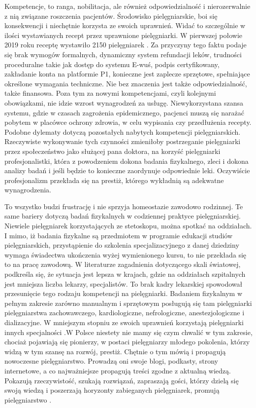 \documentclass[a4paper,12pt,twoside,openany]{report}
\begin{document}
Kompetencje, to ranga, nobilitacja, ale również odpowiedzialność i nierozerwalnie z nią związane roszczenia pacjentów. Środowisko pielęgniarskie, boi się konsekwencji i niechętnie korzysta ze swoich uprawnień. Widać to szczególnie w ilości wystawianych recept przez uprawnione pielęgniarki. W pierwszej połowie 2019 roku receptę wystawiło 2150 pielęgniarek \cite{model}. Za przyczyny tego faktu podaje się brak wymogów formalnych, dynamiczny system refundacji leków, trudności proceduralne takie jak dostęp do systemu E-wuś, podpis certyfikowany, zakładanie konta na platformie P1, konieczne jest zaplecze sprzętowe, spełniające określone wymagania techniczne.  Nie bez znaczenia jest także odpowiedzialność, także finansowa. Poza tym za nowymi kompetencjami, czyli kolejnymi obowiązkami, nie idzie wzrost wynagrodzeń za usługę. Niewykorzystana szansa systemu, gdzie w czasach zagrożenia epidemicznego, pacjenci muszą się narażać pobytem w placówce ochrony zdrowia, w celu wypisania czy przedłużenia recepty. Podobne dylematy dotyczą pozostałych nabytych kompetencji pielęgniarskich. Rzeczywiste wykonywanie tych czynności zmieniłoby postrzeganie pielęgniarki przez społeczeństwo jako służącej pana doktora, na korzyść pielęgniarki profesjonalistki, która z powodzeniem dokona badania fizykalnego, zleci i dokona analizy badań i jeśli będzie to konieczne zaordynuje odpowiednie leki. Oczywiście profesjonalizm przekłada się na prestiż, którego wykładnią są adekwatne wynagrodzenia. 

To wszystko budzi frustrację i nie sprzyja homeostazie zawodowo rodzinnej.  Te same bariery dotyczą badań fizykalnych w codziennej praktyce pielęgniarskiej. Niewiele  pielęgniarek  korzystających ze stetoskopu,  można spotkać na oddziałach. I mimo, iż badania fizykalne są przedmiotem w programie edukacji studiów pielęgniarskich, przystąpienie do szkolenia specjalizacyjnego z danej dziedziny wymaga świadectwa ukończenia wyżej wymienionego kursu, to nie przekłada się to na pracę zawodową. W literaturze zagadnienia dotyczącego skali światowej, podkreśla się, że sytuacja jest lepsza w krajach, gdzie na oddziałach szpitalnych jest mniejsza liczba lekarzy, specjalistów. To brak kadry lekarskiej spowodował przesunięcie tego rodzaju kompetencji na pielęgniarki. Badaniem fizykalnym w pełnym zakresie zarówno manualnym i sprzętowym posługują się tam pielęgniarki pielęgniarstwa zachowawczego, kardiologiczne, nefrologiczne, anestezjologiczne i dializacyjne. W mniejszym stopniu ze swoich uprawnień korzystają pielęgniarki innych specjalności \cite{badania}.W Polsce niestety nie mamy się czym chwalić w tym zakresie, chociaż pojawiają się pionierzy, w postaci pielęgniarzy młodego pokolenia, którzy widzą w tym szansę na rozwój, prestiż. Chętnie o tym mówią i propagują nowoczesne pielęgniarstwo. Prowadzą oni swoje blogi, podkasty, strony internetowe, a co najważniejsze propagują treści zgodne z aktualną wiedzą.  Pokazują rzeczywistość, szukają rozwiązań, zapraszają gości, którzy dzielą się swoją wiedzą i poszerzają horyzonty zabieganych pielęgniarek, promują pielęgniarstwo \cite{spoty}.
\end{document}
